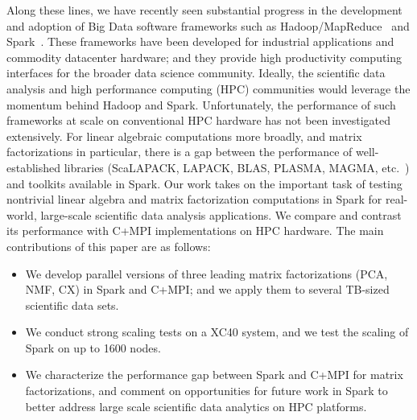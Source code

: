 Along these lines, we have recently seen substantial progress in the development and adoption of Big Data software frameworks such as Hadoop/MapReduce~\cite{DG04} and Spark~\cite{SPARK_HOTC_10}. 
These frameworks have been developed for industrial applications and commodity datacenter hardware; and they provide high productivity computing interfaces for the broader data science community.  
Ideally, the scientific data analysis and high performance computing (HPC) communities would leverage the momentum behind Hadoop and Spark.
Unfortunately, the performance of such frameworks at scale on conventional HPC hardware has not been investigated extensively. 
For linear algebraic computations more broadly, and matrix factorizations in particular, there is a gap between the performance of  well-established libraries (ScaLAPACK, LAPACK, BLAS, PLASMA, MAGMA, etc.~\cite{lapack99,PlasmaMagma2009}) and toolkits available in Spark. 
Our work takes on the important task of testing nontrivial linear algebra and matrix factorization computations in Spark for real-world, large-scale scientific data analysis applications. We compare and contrast its performance with C+MPI implementations on HPC hardware. The main contributions of this paper are as follows:
\begin{itemize}
  \item{We develop parallel versions of three leading matrix factorizations (PCA, NMF, CX) in Spark and C+MPI; and we apply them to several TB-sized scientific data sets.}
\item{We conduct strong scaling tests on a XC40 system, and we test the scaling of Spark on up to 1600 nodes.}
\item{We characterize the performance gap between Spark and C+MPI for matrix factorizations, and  comment on opportunities for future work in Spark to better address large scale scientific data analytics on HPC platforms.}
\end{itemize}

